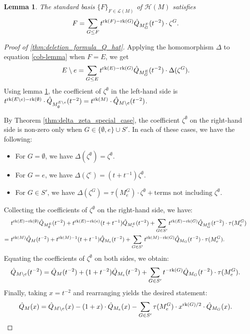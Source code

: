 \documentclass[11pt]{article}
\newcommand{\calL}{\mathcal{L}}
\newcommand{\calH}{\mathcal{H}}
\newcommand{\rank}{\normalfont\text{rk}}
\newtheorem{lemma}[theorem]{Lemma}
\theoremstyle{remark}
\begin{document}
\begin{lemma}
    \label{lem:standard_basis_in_zeta}
    The standard basis $\{F\}_{F \in \calL(M)}$ of $\calH(M)$ satisfies
    \begin{equation}
        \label{cob-lemma}
        F = \sum_{G \leq F} t^{\rank(F) - \rank(G)} \hat{Q}_{M_G^F}(t^{-2}) \cdot \zeta^G.
    \end{equation}
\end{lemma}

\begin{proof}[Proof of \ref{thm:deletion_formula_Q_hat}]
    Applying the homomorphism $\Delta$ to equation \ref{cob-lemma}
    when $F = E$, we get
    \[E\setminus e = \sum_{G \leq E} t^{\rank(E) - \rank(G)} \hat{Q}_{M_G^E}(t^{-2}) \cdot \Delta(\zeta^G).\]
    Using lemma \ref{lem:standard_basis_in_zeta}, the coefficient of $\zeta^\emptyset$ in the left-hand side is
    $t^{\rank(E\setminus e) - \rank(\emptyset)}\cdot
        \hat{Q}_{M_\emptyset^{E\setminus e}}(t^{-2}) = t^{\rank(M)}\cdot
        \hat{Q}_{M\setminus e}(t^{-2})$.

    By Theorem \ref{thm:delta_zeta_special_case}, the coefficient $\zeta^\emptyset$ on the right-hand side is non-zero only when $G\in \{\emptyset, e\} \cup S'$. In each of these cases, we have the following:
    \begin{itemize}
        \item For $G = \emptyset$, we have $\Delta(\zeta^\emptyset) = \zeta^\emptyset$.
        \item For $G = e$, we have $\Delta(\zeta^e) = (t+t^{-1})\zeta^\emptyset$.
        \item For $G\in S'$, we have $\Delta(\zeta^G) = \tau(M^G_e)\cdot\zeta^\emptyset
                  +\text{terms not including $\zeta^\emptyset$}$.
    \end{itemize}

    Collecting the coefficients of
    $\zeta^\emptyset$ on the right-hand side, we have:
    \begin{align*}
            & t^{\rank(E) - \rank(\emptyset)}
        \hat{Q}_{M_\emptyset^E}(t^{-2}) + t^{\rank(E) - \rank(e)}(t+t^{-1})
        \hat{Q}_{M_e^E}(t^{-2}) + \sum_{G\in S'} t^{\rank(E) - \rank(G)}
        \hat{Q}_{M_G^E}(t^{-2})\cdot \tau(M^G_e) \\
        =\  & t^{\rank(M)}
        \hat{Q}_{M}(t^{-2}) + t^{\rank(M) - 1}(t+t^{-1})
        \hat{Q}_{M_e}(t^{-2}) + \sum_{G\in S'} t^{\rank(M) - \rank(G)}
        \hat{Q}_{M_G}(t^{-2})\cdot \tau(M^G_e).
    \end{align*}
    Equating the coefficients of $\zeta^\emptyset$ on both sides, we obtain:
    \[\hat{Q}_{M\setminus e}(t^{-2}) = \hat{Q}_{M}(t^{-2}) + (1+t^{-2})
        \hat{Q}_{M_e}(t^{-2}) + \sum_{G\in S'} t^{- \rank(G)}
        \hat{Q}_{M_G}(t^{-2})\cdot \tau(M^G_e).\]
    Finally, taking $x = t^{-2}$ and rearranging yields the desired statement: \[
        \hat{Q}_M(x) = \hat{Q}_{M\setminus e}(x) -(1 + x)\cdot \hat{Q}_{M_e}(x) -
        \sum_{G \in S'}{\tau(M^G_e)\cdot x^{\rank(G)/2}\cdot
            \hat{Q}_{M_G}(x)}.
    \]
\end{proof}
\end{document}
